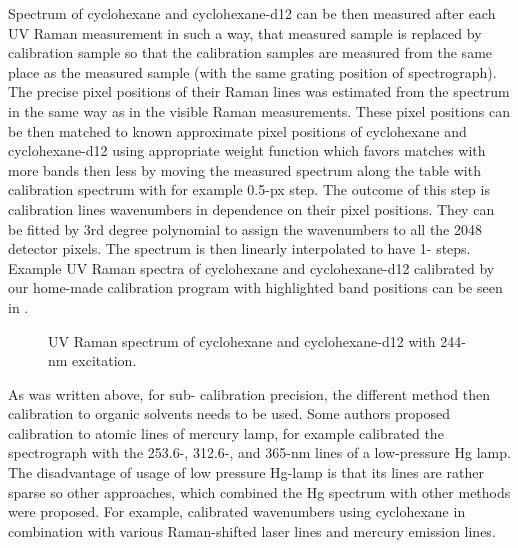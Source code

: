 \begin{table}
	\centering
	
	\caption{%
		Estimated wavenumbers $\tilde{\nu}$ of cyclohexane (H) and cyclohexane-d12
		(D) with the corresponding pixel positions $x$ from UV Raman measurement.%
	}
	\label{\tablabel{wavenumber_calibration:cyclohexane_wavenumbers}}
\end{table}

Spectrum of cyclohexane and cyclohexane-d12 can be then measured after each
UV Raman measurement in such a way, that measured sample is replaced by
calibration sample so that the calibration samples are measured from the same
place as the measured sample (with the same grating position of spectrograph).
The precise pixel positions of their Raman lines was estimated from the
spectrum in the same way as in the visible Raman measurements. These pixel
positions can be then matched to known approximate pixel positions of
cyclohexane and cyclohexane-d12 using appropriate weight function which
favors matches with more bands then less by moving the measured spectrum along
the table with calibration spectrum with for example 0.5-px step. The outcome
of this step is calibration lines wavenumbers in dependence on their pixel
positions. They can be fitted by 3rd degree polynomial to assign the
wavenumbers to all the 2048 detector pixels. The spectrum is then linearly
interpolated to have 1-\icm{} steps. Example UV Raman spectra of cyclohexane
and cyclohexane-d12 calibrated by our home-made calibration program with
highlighted band positions can be seen in
.

\begin{figure}
	\centering
	
	\caption{%
		UV Raman spectrum of cyclohexane and cyclohexane-d12 with 244-nm
		excitation.%
	}
	\label{\figlabel{wavenumber_calibration:cyclohexane_spc}}
\end{figure}

As was written above, for sub-\icm{} calibration precision, the different
method then calibration to organic solvents needs to be used. Some authors
proposed calibration to atomic lines of mercury lamp, for example
\textcite{Manoharan1990,Efremov1991} calibrated the spectrograph with the
253.6-, 312.6-, and 365-nm lines of a low-pressure Hg lamp. The disadvantage
of usage of low pressure Hg-lamp is that its lines are rather sparse so
other approaches, which combined the Hg spectrum with other methods were
proposed. For example, \textcite{Myers1988} calibrated wavenumbers using
cyclohexane in combination with various  Raman-shifted laser lines and
mercury emission lines.

